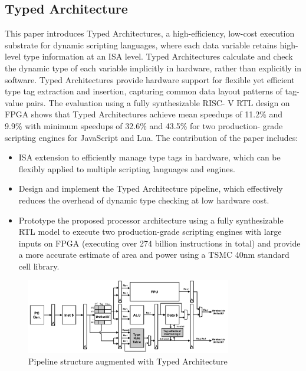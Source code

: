 \subsection{Typed Architecture \cite{TypedArchitecture}}
This paper introduces Typed
Architectures, a high-efficiency, low-cost execution substrate 
for dynamic scripting languages, where each data
variable retains high-level type information at an ISA level.
Typed Architectures calculate and check the dynamic type
of each variable implicitly in hardware, rather than explicitly
in software. Typed Architectures provide
hardware support for flexible yet efficient type tag extraction
and insertion, capturing common data layout patterns of tag-
value pairs. The evaluation using a fully synthesizable RISC-
V RTL design on FPGA shows that Typed Architectures
achieve mean speedups of 11.2\% and 9.9\% with
minimum speedups of 32.6\% and 43.5\% for two production-
grade scripting engines for JavaScript and Lua. 
The contribution of the paper includes:
\begin{itemize}
  \item ISA extension to efficiently manage
type tags in hardware, which can be flexibly applied to
multiple scripting languages and engines.
  \item Design and implement the Typed Architecture pipeline,
which effectively reduces the overhead of dynamic type
checking at low hardware cost.
  \item Prototype the proposed processor architecture using 
a fully synthesizable RTL model to execute two
production-grade scripting engines with large inputs on
FPGA (executing over 274 billion instructions in total)
and provide a more accurate estimate of area and power
using a TSMC 40nm standard cell library.
\end{itemize}

\begin{figure}[htbp!] 
  \centering    
  \includegraphics[width=0.8\textwidth]{TypedArchitecture}
  \caption[TypedArchitecture]{Pipeline structure augmented with Typed Architecture \cite{TypedArchitecture}}
  \label{fig:TypedArchitecture}
  \end{figure}

